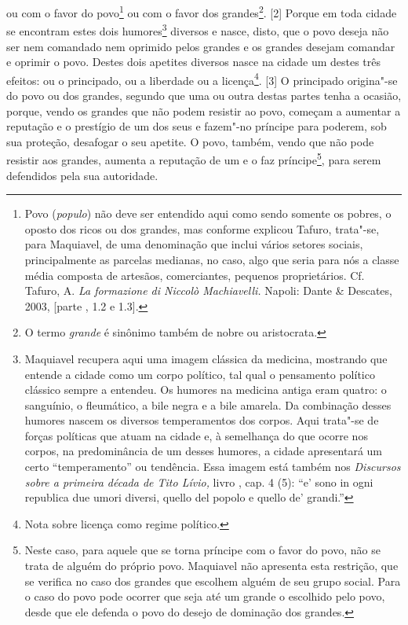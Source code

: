 ou com o favor do povo\footnote{Povo (\emph{populo}) não deve ser
  entendido aqui como sendo somente os pobres, o oposto dos ricos ou dos
  grandes, mas conforme explicou Tafuro, trata"-se, para Maquiavel, de
  uma denominação que inclui vários setores sociais, principalmente as
  parcelas medianas, no caso, algo que seria para nós a classe média
  composta de artesãos, comerciantes, pequenos proprietários. Cf.
  Tafuro, A. \emph{La formazione di Niccolò Machiavelli.} Napoli: Dante
  \& Descates, 2003, {[}parte , 1.2 e 1.3{]}.} ou com o favor dos
grandes\footnote{O termo \emph{grande} é sinônimo também de nobre ou
  aristocrata.}. {[}2{]} Porque em toda cidade se encontram estes dois
humores\footnote{Maquiavel recupera aqui uma imagem clássica da
  medicina, mostrando que entende a cidade como um corpo político, tal
  qual o pensamento político clássico sempre a entendeu. Os humores na
  medicina antiga eram quatro: o sanguínio, o fleumático, a bile negra e
  a bile amarela. Da combinação desses humores nascem os diversos
  temperamentos dos corpos. Aqui trata"-se de forças políticas que atuam
  na cidade e, à semelhança do que ocorre nos corpos, na predominância
  de um desses humores, a cidade apresentará um certo ``temperamento''
  ou tendência. Essa imagem está também nos \emph{Discursos sobre a
  primeira década de Tito Lívio,} livro , cap. 4 (5): ``e' sono in ogni
  republica due umori diversi, quello del popolo e quello de' grandi.''}
diversos e nasce, disto, que o povo deseja não ser nem comandado nem
oprimido pelos grandes e os grandes desejam comandar e oprimir o povo.
Destes dois apetites diversos nasce na cidade um destes três efeitos: ou
o principado, ou a liberdade ou a licença\footnote{Nota sobre licença
  como regime político.}. {[}3{]} O principado origina"-se do povo ou dos
grandes, segundo que uma ou outra destas partes tenha a ocasião, porque,
vendo os grandes que não podem resistir ao povo, começam a aumentar a
reputação e o prestígio de um dos seus e fazem"-no príncipe para poderem,
sob sua proteção, desafogar o seu apetite. O povo, também, vendo que não
pode resistir aos grandes, aumenta a reputação de um e o faz
príncipe\footnote{Neste caso, para aquele que se torna príncipe com o
  favor do povo, não se trata de alguém do próprio povo. Maquiavel não
  apresenta esta restrição, que se verifica no caso dos grandes que
  escolhem alguém de seu grupo social. Para o caso do povo pode ocorrer
  que seja até um grande o escolhido pelo povo, desde que ele defenda o
  povo do desejo de dominação dos grandes.}, para serem defendidos pela
sua autoridade.

